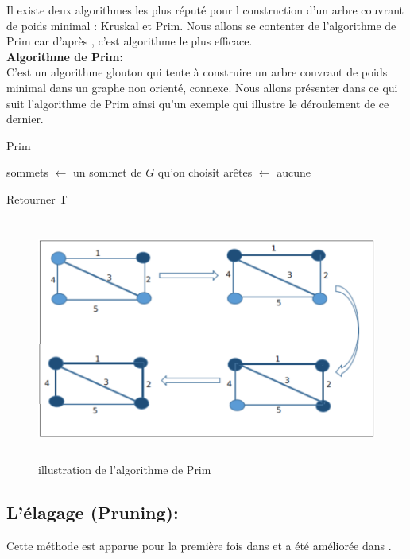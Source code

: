 	
Il existe deux algorithmes les plus réputé pour l construction d’un arbre  couvrant de poids minimal :  Kruskal et Prim. Nous allons se contenter de l’algorithme de Prim car d’après \cite{prim1957shortest}, c’est algorithme le plus efficace.\\


\textbf{Algorithme de Prim:}\\
C’est un algorithme  glouton qui tente à construire un arbre couvrant de poids minimal dans un graphe non orienté, connexe. Nous allons présenter dans ce qui suit l’algorithme de Prim ainsi qu’un exemple qui illustre le déroulement de ce dernier.\\

\begin{algorithm}[H]
\label{alg3:prim}
\caption{Prim}
\SetAlgoLined
\DontPrintSemicolon
\large


sommets $\gets$ un sommet de $G$ qu’on choisit \;
arêtes $\gets$ aucune 

Retourner T \;
\end{algorithm}

\begin{figure}[H]
	\centering
	\includegraphics[width=15cm,height=8cm]{Chap3/3.png}
	\caption{illustration de l’algorithme de Prim}
	\label{fig:33}
\end{figure}


\subsection{L’élagage (Pruning):}
Cette méthode est apparue pour la première fois dans \cite{shin2010approximation,zhang2008new} et a été améliorée dans \cite{sundar2013new}.

